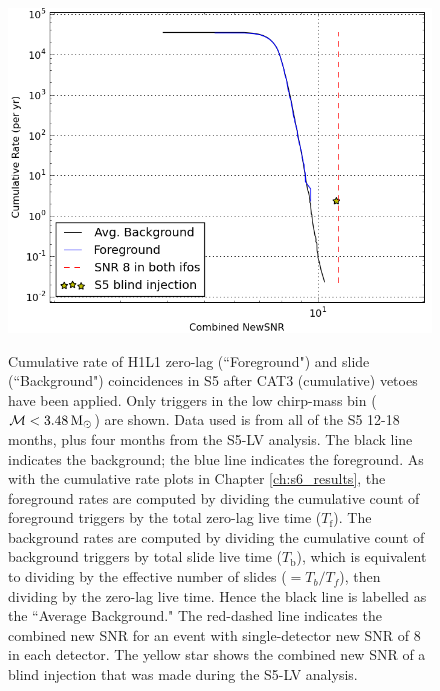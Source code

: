 \begin{figure}[p]
\center
\includegraphics[width=6in]{figures/ligo_south/Cat3-newsnr-low_mass.png}
\label{fig:ligo_south-cat3_newsnr}
\caption{Cumulative rate of H1L1 zero-lag (``Foreground") and slide
(``Background") coincidences in S5 after CAT3 (cumulative) vetoes have
been applied. Only triggers in the low chirp-mass bin ($\mathcal{M} < 3.48\,\mathrm{M_\odot}$)
are shown. Data used is from all of the S5 12-18 months, plus four months
from the S5-LV analysis. The black line indicates the background; the blue
line indicates the foreground. As with the cumulative rate plots in Chapter
\ref{ch:s6_results}, the foreground rates are computed by dividing the
cumulative count of foreground triggers by the total zero-lag live time
($T_{\mathrm{f}}$). The background rates are computed by dividing the
cumulative count of background triggers by total slide live time
($T_{\mathrm{b}}$), which is equivalent to dividing by the effective number of
slides ($= T_{b}/T_{f}$), then dividing by the zero-lag live time. Hence the
black line is labelled as the ``Average Background." The red-dashed line
indicates the combined new SNR for an event with single-detector new
SNR of $8$ in each detector. The yellow star shows the combined new
SNR of a blind injection that was made during the S5-LV analysis.}
\end{figure}

